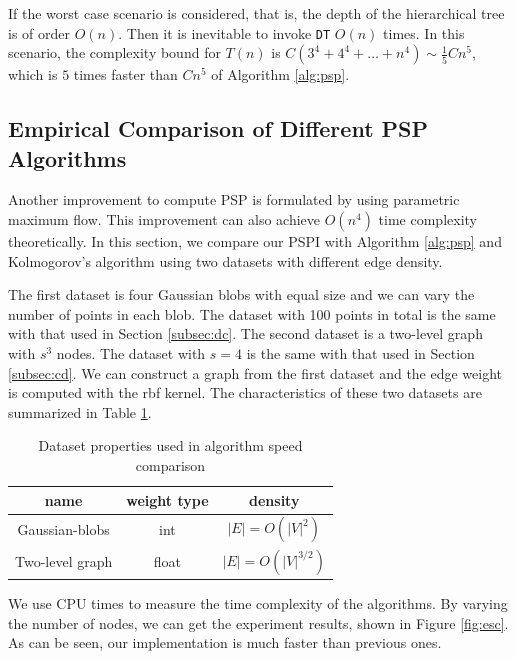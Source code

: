 If the worst case scenario is considered, that is, the depth of the hierarchical tree is of order $O(n)$. Then it is inevitable to invoke \texttt{DT} $O(n)$ times.
In this scenario, the complexity bound for $T(n)$ is $C(3^4+4^4 + \dots + n^4) \sim \frac{1}{5}Cn^5$, which is $5$ times faster than $Cn^5$ of Algorithm \ref{alg:psp}.

\subsection{Empirical Comparison of Different PSP Algorithms}
Another improvement to compute PSP is formulated by \cite{kolmogorov} using parametric maximum flow.
This improvement can also achieve $O(n^4)$ time complexity theoretically. 
In this section, we compare our PSPI with Algorithm \ref{alg:psp} and Kolmogorov's algorithm
using two datasets with different edge density.

The first dataset is four Gaussian blobs with equal size and we can vary the number of points in each blob. The dataset with 100 points in total is the same with that used in 
Section \ref{subsec:dc}. The second dataset is a two-level graph with $s^3$ nodes. The dataset with $s=4$ is the same with that used in Section \ref{subsec:cd}.
We can construct a graph from the first dataset and the edge weight is computed with the rbf kernel. The characteristics of these two datasets are summarized in
Table \ref{tab:alg_compare}.
\begin{table}[!ht]
\centering
\begin{tabular}{ccc}
\hline
name & weight type & density \\
\hline
Gaussian-blobs & int & $|E|=O(|V|^2)$\\
Two-level graph & float & $|E|=O(|V|^{3/2})$\\
\hline
\end{tabular}
\caption{Dataset properties used in algorithm speed comparison} \label{tab:alg_compare}
\end{table}
We use CPU times to measure the time complexity of the algorithms. By varying the number of nodes, we can get the experiment results, shown in Figure \ref{fig:esc}.
As can be seen, our implementation is much faster than previous ones.

